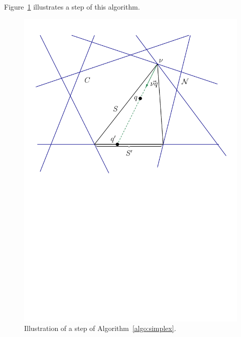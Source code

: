 Figure~\ref{fig:meiser:step} illustrates a step of this algorithm.

\begin{figure}
\begin{center}
\includegraphics[trim=90 47 50 13,clip=true,height=0.25\textheight]{figures/simplex}
\caption{%
Illustration of a step of Algorithm~\ref{algo:simplex}.
}
\label{fig:meiser:step}
\end{center}
\end{figure}

